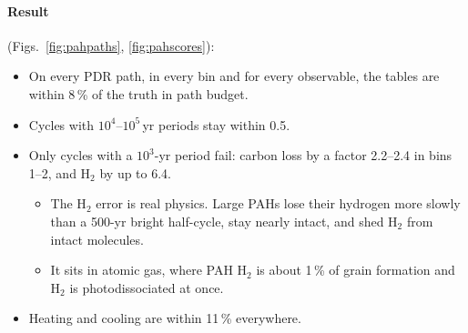 \documentclass[11pt,a4paper]{article}
\begin{document}
\paragraph{Result} (Figs.~\ref{fig:pahpaths}, \ref{fig:pahscores}):
\begin{itemize}
\item On every PDR path, in every bin and for every observable, the tables are within 8\,\% of the truth in path budget.
\item Cycles with $10^4$--$10^5$\,yr periods stay within 0.5.
\item Only cycles with a $10^3$-yr period fail: carbon loss by a factor 2.2--2.4 in bins 1--2, and H$_2$ by up to 6.4.
  \begin{itemize}
  \item The H$_2$ error is real physics. Large PAHs lose their hydrogen more slowly than a 500-yr bright half-cycle,
    stay nearly intact, and shed H$_2$ from intact molecules.
  \item It sits in atomic gas, where PAH H$_2$ is about 1\,\% of grain formation and H$_2$ is photodissociated at once.
  \end{itemize}
\item Heating and cooling are within 11\,\% everywhere.
\end{itemize}
\end{document}
